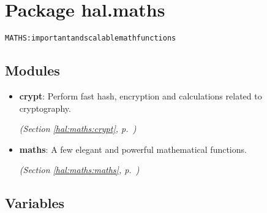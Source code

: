 %
%
%


\section{Package hal.maths}

    \label{hal:maths}
\begin{alltt}
MATHS: important and scalable math functions 
\end{alltt}



\subsection{Modules}

\begin{itemize}
\setlength{\parskip}{0ex}
\item \textbf{crypt}: Perform fast hash, encryption and calculations related to cryptography. 


  \textit{(Section \ref{hal:maths:crypt}, p.~\pageref{hal:maths:crypt})}

\item \textbf{maths}: A few elegant and powerful mathematical functions. 


  \textit{(Section \ref{hal:maths:maths}, p.~\pageref{hal:maths:maths})}

\end{itemize}



  \subsection{Variables}

